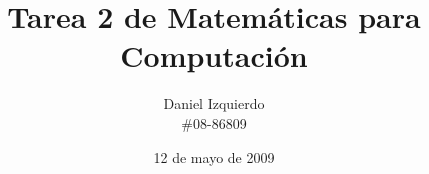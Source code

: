 \documentclass{article}
\begin{document}

\title{Tarea 2 de Matemáticas para Computación}
\author{Daniel Izquierdo \\ \#08-86809}
\date{12 de mayo de 2009}

\maketitle

\section{}

\section{}

\section{}

\section{}

\section{}
\end{document}

